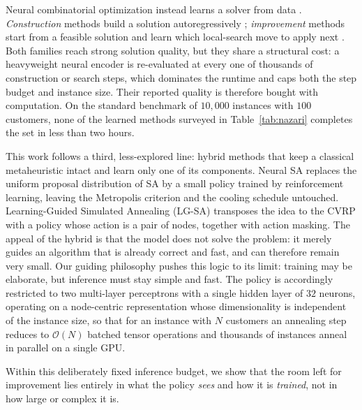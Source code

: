 \documentclass[letterpaper]{article} %
\begin{document}
Neural combinatorial optimization instead learns a solver from data \citep{wu_neural_survey_2024}. \emph{Construction} methods build a solution autoregressively \citep{nazari_reinforcement_2018,kool_attention_2019,kwon_pomo_2021}; \emph{improvement} methods start from a feasible solution and learn which local-search move to apply next \citep{chen_learning_2019,wu_learning_2022,ma_learning_2021,ma_learning_2023}. Both families reach strong solution quality, but they share a structural cost: a heavyweight neural encoder is re-evaluated at every one of thousands of construction or search steps, which dominates the runtime and caps both the step budget and instance size. Their reported quality is therefore bought with computation. On the standard benchmark of $10{,}000$ instances with $100$ customers, none of the learned methods surveyed in Table~\ref{tab:nazari} completes the set in less than two hours.

This work follows a third, less-explored line: hybrid methods that keep a classical metaheuristic intact and learn only one of its components. Neural SA \citep{correia_neural_2023} replaces the uniform proposal distribution of SA by a small policy trained by reinforcement learning, leaving the Metropolis criterion and the cooling schedule untouched. Learning-Guided Simulated Annealing (LG-SA) \citep{AndrettiEtAl26} transposes the idea to the CVRP with a policy whose action is a pair of nodes, together with action masking. The appeal of the hybrid is that the model does not solve the problem: it merely guides an algorithm that is already correct and fast, and can therefore remain very small. Our guiding philosophy pushes this logic to its limit: training may be elaborate, but inference must stay simple and fast. The policy is accordingly restricted to two multi-layer perceptrons with a single hidden layer of $32$ neurons, operating on a node-centric representation whose dimensionality is independent of the instance size, so that for an instance with $N$ customers an annealing step reduces to $\mathcal{O}(N)$ batched tensor operations and thousands of instances anneal in parallel on a single GPU.

Within this deliberately fixed inference budget, we show that the room left for improvement lies entirely in what the policy \emph{sees} and how it is \emph{trained}, not in how large or complex it is.
\end{document}
